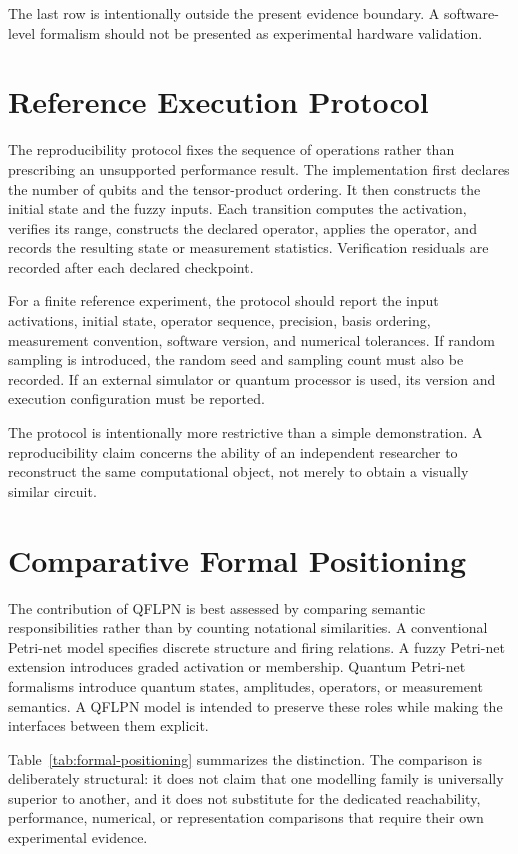 \documentclass[final,3p,times]{elsarticle}
\begin{document}
The last row is intentionally outside the present evidence boundary. A software-level formalism should not be presented as experimental hardware validation.

\section{Reference Execution Protocol}

The reproducibility protocol fixes the sequence of operations rather than prescribing an unsupported performance result. The implementation first declares the number of qubits and the tensor-product ordering. It then constructs the initial state and the fuzzy inputs. Each transition computes the activation, verifies its range, constructs the declared operator, applies the operator, and records the resulting state or measurement statistics. Verification residuals are recorded after each declared checkpoint.

For a finite reference experiment, the protocol should report the input activations, initial state, operator sequence, precision, basis ordering, measurement convention, software version, and numerical tolerances. If random sampling is introduced, the random seed and sampling count must also be recorded. If an external simulator or quantum processor is used, its version and execution configuration must be reported.

The protocol is intentionally more restrictive than a simple demonstration. A reproducibility claim concerns the ability of an independent researcher to reconstruct the same computational object, not merely to obtain a visually similar circuit.

\section{Comparative Formal Positioning}

The contribution of QFLPN is best assessed by comparing semantic responsibilities rather than by counting notational similarities. A conventional Petri-net model specifies discrete structure and firing relations. A fuzzy Petri-net extension introduces graded activation or membership. Quantum Petri-net formalisms introduce quantum states, amplitudes, operators, or measurement semantics. A QFLPN model is intended to preserve these roles while making the interfaces between them explicit.

Table~\ref{tab:formal-positioning} summarizes the distinction. The comparison is deliberately structural: it does not claim that one modelling family is universally superior to another, and it does not substitute for the dedicated reachability, performance, numerical, or representation comparisons that require their own experimental evidence.
\end{document}
